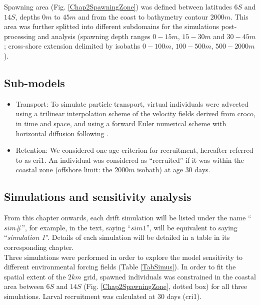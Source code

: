 Spawning area (Fig. \ref{Chap2SpawningZone}) was defined between latitudes $6$\textdegree $S$ and $14$\textdegree $S$, depths $0 m$ to $45 m$ and from the coast to bathymetry contour $2000 m$. This area was further splitted into different subdomains for the simulations post-processing and analysis (spawning depth ranges $0-15 m$, $15-30 m$ and $30-45 m$; cross-shore extension delimited by isobaths $0-100 m$, $100-500 m$, $500-2000 m$).\\

\subsection{Sub-models}\label{Chap2MethSubMod}

\begin{itemize}

\item Transport: To simulate particle transport, virtual individuals were advected using a trilinear interpolation scheme of the velocity fields derived from \acrshort{croco}, in time and space, and using a forward Euler numerical scheme with horizontal diffusion following \cite{PeliMarc2007}.\\

\item Retention: We considered one age-criterion for recruitment, hereafter referred to as \gls{cri1}. An individual was considered as ``recruited'' if it was within the coastal zone (offshore limit: the $2000 m$ isobath) at age $30$ days.\\

\end{itemize}

\subsection{Simulations and sensitivity analysis}\label{Chap2MethSimSens}

From this chapter onwards, each drift simulation will be listed under the name ``\textbf{$sim \#$}'', for example, in the text, saying ``$sim 1$'', will be equivalent to saying ``\textit{simulation 1}''. Details of each simulation will be detailed in a table in its corresponding chapter.\\

Three simulations were performed in order to explore the model sensitivity to different environmental forcing fields (Table \ref{TabSimus}). In order to fit the spatial extent of the $2 km$ grid, spawned individuals was constrained in the coastal area between $6$\textdegree $S$ and $14$\textdegree $S$ (Fig. \ref{Chap2SpawningZone}, dotted box) for all three simulations. Larval recruitment was calculated at $30$ days (\gls{cri1}).\\

